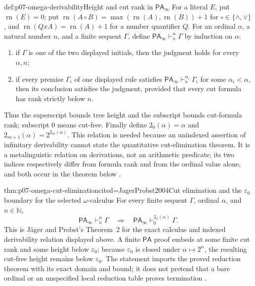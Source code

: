 \begin{hbdefinition}{def:p07-omega-derivability}{Height and cut rank in \(\mathsf{PA}_{\infty}\)}
For a literal \(E\), put \(\operatorname{rn}(E)=0\); put
\(\operatorname{rn}(A\circ B)=\max(\operatorname{rn}(A),
\operatorname{rn}(B))+1\) for \(\circ\in\{\land,\lor\}\), and
\(\operatorname{rn}(QxA)=\operatorname{rn}(A)+1\) for a number quantifier
\(Q\).  For an ordinal \(\alpha\), a natural number \(n\), and a finite
sequent \(\Gamma\), define
\(\mathsf{PA}_{\infty}\vdash_n^\alpha\Gamma\) by induction on \(\alpha\):

\begin{enumerate}
  \item if \(\Gamma\) is one of the two displayed initials, then the judgment
        holds for every \(\alpha,n\);
  \item if every premise \(\Gamma_i\) of one displayed rule satisfies
        \(\mathsf{PA}_{\infty}\vdash_n^{\alpha_i}\Gamma_i\) for some
        \(\alpha_i<\alpha\), then its conclusion satisfies the judgment,
        provided that every cut formula has rank strictly below \(n\).
\end{enumerate}

Thus the superscript bounds tree height and the subscript bounds cut-formula
rank; subscript \(0\) means cut-free.  Finally define
\(2_0(\alpha)=\alpha\) and \(2_{m+1}(\alpha)=2^{2_m(\alpha)}\).  This relation is
needed because an unindexed assertion of infinitary derivability cannot state
the quantitative cut-elimination theorem.  It is a metalinguistic relation on
derivations, not an arithmetic predicate; its two indices respectively differ
from formula rank and from the ordinal value alone, and both occur in the
theorem below \cite[Definition~1 and Theorem~2]{JagerProbst2004}.
\end{hbdefinition}

\begin{hbtheorem}{thm:p07-omega-cut-elimination}{cited=JagerProbst2004}{Cut elimination and the \(\varepsilon_0\) boundary for the selected \(\omega\)-calculus}
For every finite sequent \(\Gamma\), ordinal \(\alpha\), and
\(n\in\mathbb N\),
\[
  \mathsf{PA}_{\infty}\vdash_n^\alpha\Gamma
  \quad\Longrightarrow\quad
  \mathsf{PA}_{\infty}\vdash_0^{2_n(\alpha)}\Gamma .
\]
This is J\"ager and Probst's Theorem~2 for the exact calculus and indexed
derivability relation displayed above.  A finite \(\mathsf{PA}\) proof embeds
at some finite cut rank and some height below \(\varepsilon_0\); because
\(\varepsilon_0\) is closed under \(\alpha\mapsto2^\alpha\), the resulting
cut-free height remains below \(\varepsilon_0\).  The statement imports the
proved reduction theorem with its exact domain and bound; it does not pretend
that a bare ordinal or an unspecified local reduction table proves termination
\cite{Schuette1977,Pohlers2009,JagerProbst2004}.
\end{hbtheorem}

